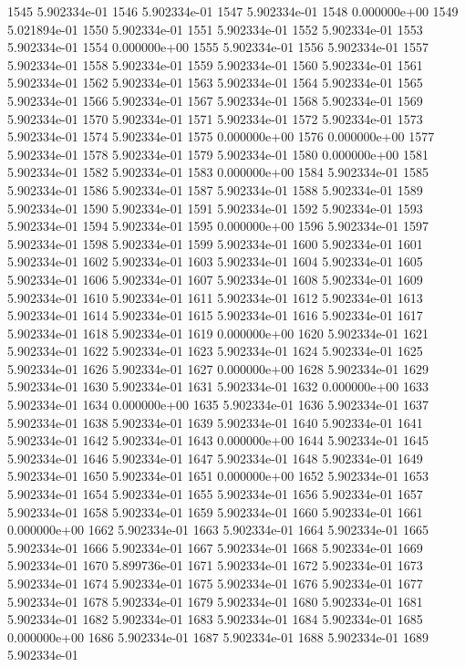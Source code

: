\documentclass{article}
\begin{document}
\begin{Schunk}
\begin{Soutput}
1545 5.902334e-01
1546 5.902334e-01
1547 5.902334e-01
1548 0.000000e+00
1549 5.021894e-01
1550 5.902334e-01
1551 5.902334e-01
1552 5.902334e-01
1553 5.902334e-01
1554 0.000000e+00
1555 5.902334e-01
1556 5.902334e-01
1557 5.902334e-01
1558 5.902334e-01
1559 5.902334e-01
1560 5.902334e-01
1561 5.902334e-01
1562 5.902334e-01
1563 5.902334e-01
1564 5.902334e-01
1565 5.902334e-01
1566 5.902334e-01
1567 5.902334e-01
1568 5.902334e-01
1569 5.902334e-01
1570 5.902334e-01
1571 5.902334e-01
1572 5.902334e-01
1573 5.902334e-01
1574 5.902334e-01
1575 0.000000e+00
1576 0.000000e+00
1577 5.902334e-01
1578 5.902334e-01
1579 5.902334e-01
1580 0.000000e+00
1581 5.902334e-01
1582 5.902334e-01
1583 0.000000e+00
1584 5.902334e-01
1585 5.902334e-01
1586 5.902334e-01
1587 5.902334e-01
1588 5.902334e-01
1589 5.902334e-01
1590 5.902334e-01
1591 5.902334e-01
1592 5.902334e-01
1593 5.902334e-01
1594 5.902334e-01
1595 0.000000e+00
1596 5.902334e-01
1597 5.902334e-01
1598 5.902334e-01
1599 5.902334e-01
1600 5.902334e-01
1601 5.902334e-01
1602 5.902334e-01
1603 5.902334e-01
1604 5.902334e-01
1605 5.902334e-01
1606 5.902334e-01
1607 5.902334e-01
1608 5.902334e-01
1609 5.902334e-01
1610 5.902334e-01
1611 5.902334e-01
1612 5.902334e-01
1613 5.902334e-01
1614 5.902334e-01
1615 5.902334e-01
1616 5.902334e-01
1617 5.902334e-01
1618 5.902334e-01
1619 0.000000e+00
1620 5.902334e-01
1621 5.902334e-01
1622 5.902334e-01
1623 5.902334e-01
1624 5.902334e-01
1625 5.902334e-01
1626 5.902334e-01
1627 0.000000e+00
1628 5.902334e-01
1629 5.902334e-01
1630 5.902334e-01
1631 5.902334e-01
1632 0.000000e+00
1633 5.902334e-01
1634 0.000000e+00
1635 5.902334e-01
1636 5.902334e-01
1637 5.902334e-01
1638 5.902334e-01
1639 5.902334e-01
1640 5.902334e-01
1641 5.902334e-01
1642 5.902334e-01
1643 0.000000e+00
1644 5.902334e-01
1645 5.902334e-01
1646 5.902334e-01
1647 5.902334e-01
1648 5.902334e-01
1649 5.902334e-01
1650 5.902334e-01
1651 0.000000e+00
1652 5.902334e-01
1653 5.902334e-01
1654 5.902334e-01
1655 5.902334e-01
1656 5.902334e-01
1657 5.902334e-01
1658 5.902334e-01
1659 5.902334e-01
1660 5.902334e-01
1661 0.000000e+00
1662 5.902334e-01
1663 5.902334e-01
1664 5.902334e-01
1665 5.902334e-01
1666 5.902334e-01
1667 5.902334e-01
1668 5.902334e-01
1669 5.902334e-01
1670 5.899736e-01
1671 5.902334e-01
1672 5.902334e-01
1673 5.902334e-01
1674 5.902334e-01
1675 5.902334e-01
1676 5.902334e-01
1677 5.902334e-01
1678 5.902334e-01
1679 5.902334e-01
1680 5.902334e-01
1681 5.902334e-01
1682 5.902334e-01
1683 5.902334e-01
1684 5.902334e-01
1685 0.000000e+00
1686 5.902334e-01
1687 5.902334e-01
1688 5.902334e-01
1689 5.902334e-01

\end{Soutput}
\end{Schunk}
\end{document}
